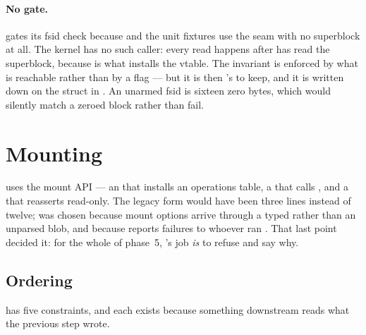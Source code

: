 \paragraph{No  gate.}  gates its fsid check
because  and the unit fixtures use the seam with no superblock at
all. The kernel has no such caller: every read happens after
 has read the superblock, because  is
what installs the vtable. The invariant is enforced by what is reachable rather
than by a flag --- but it is then 's to keep, and it is
written down on the struct in . An unarmed fsid is
sixteen zero bytes, which would silently match a zeroed block rather than fail.


\section{Mounting}

 uses the  mount API --- an
 that installs an operations table, a
 that calls , and a
 that reasserts read-only. The legacy 
form would have been three lines instead of twelve;  was
chosen because mount options arrive through a typed 
rather than an unparsed blob, and because  reports failures to
whoever ran . That last point decided it: for the whole of phase~5,
's job \emph{is} to refuse and say why.

\subsection{Ordering}

 has five constraints, and each exists because something
downstream reads what the previous step wrote.


